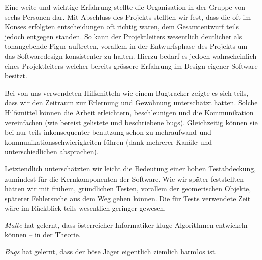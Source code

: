   Eine weite und wichtige Erfahrung stellte die Organisation in der Gruppe von
  sechs Personen dar. Mit Abschluss des Projekts stellten wir fest, dass die oft
  im Konses erfolgten entscheidungen oft richtig waren, dem Gesamtentwurf teils
  jedoch entgegen standen. So kann der Projektleiters wesentlich deutlicher als
  tonangebende Figur auftreten, vorallem in der Entwurfsphase des Projekts um
  das Softwaredesign konsistenter zu halten. Hierzu bedarf es jedoch
  wahrscheinlich eines Projektleiters welcher bereits grössere Erfahrung im
  Design eigener Software besitzt.

  Bei von uns verwendeten Hilfsmitteln wie einem Bugtracker zeigte es sich
  teils, dass wir den Zeitraum zur Erlernung und Gewöhnung unterschätzt hatten.
  Solche Hilfsmittel können die Arbeit erleichtern, beschleunigen und die
  Kommunikation vereinfachen (wie bereist gelistete und beschriebene bugs).
  Gleichzeitig können sie bei nur teils inkonsequenter benutzung schon zu
  mehraufwand und kommunikationsschwierigkeiten führen (dank mehrerer Kanäle und
  unterschiedlichen absprachen).

  Letztendlich unterschätzten wir leicht die Bedeutung einer hohen
  Testabdeckung, zumindest für die Kernkomponenten der Software. Wie wir später
  feststellten hätten wir mit frühem, gründlichen Testen, vorallem der
  geomerischen Objekte, späterer Fehlersuche aus dem Weg gehen können. Die für
  Tests verwendete Zeit wäre im Rückblick teils wesentlich geringer gewesen.

  \begin{lessonlearned}
    \emph{Malte} hat gelernt, dass österreicher Informatiker kluge 
    Algorithmen entwickeln können -- in der Theorie.
  \end{lessonlearned}

  \begin{lessonlearned}
    \emph{Bugs} hat gelernt, dass der böse Jäger eigentlich 
    ziemlich harmlos ist.
  \end{lessonlearned}

